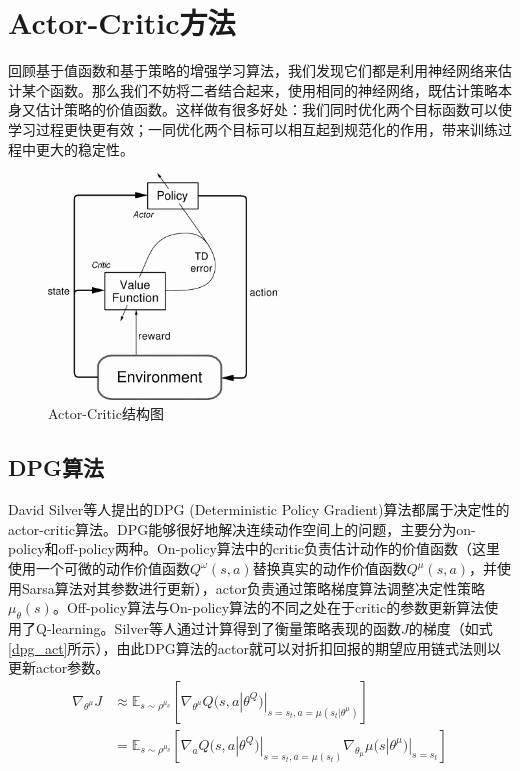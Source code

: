\section{Actor-Critic方法}
回顾基于值函数和基于策略的增强学习算法，我们发现它们都是利用神经网络来估计某个函数。那么我们不妨将二者结合起来，使用相同的神经网络，既估计策略本身又估计策略的价值函数。这样做有很多好处：我们同时优化两个目标函数可以使学习过程更快更有效；一同优化两个目标可以相互起到规范化的作用，带来训练过程中更大的稳定性。
\begin{figure}
    \centering
    \includegraphics[height=6cm]{figure/actor-critic.png}
    \caption{Actor-Critic结构图}
    \label{fig:actor-critic}
\end{figure}
\subsection{DPG算法}
\label{sec:DPG}
David Silver等人提出的DPG (Deterministic Policy Gradient)\cite{silver2014deter}算法都属于决定性的actor-critic算法。DPG能够很好地解决连续动作空间上的问题，主要分为on-policy和off-policy两种。On-policy算法中的critic负责估计动作的价值函数（这里使用一个可微的动作价值函数$Q^\omega(s,a)$替换真实的动作价值函数$Q^\mu(s,a)$，并使用Sarsa算法对其参数进行更新），actor负责通过策略梯度算法调整决定性策略$\mu_\theta(s)$。Off-policy算法与On-policy算法的不同之处在于critic的参数更新算法使用了Q-learning。Silver等人通过计算得到了衡量策略表现的函数$J$的梯度\cite{silver2014deter}（如式\ref{dpg_act}所示），由此DPG算法的actor就可以对折扣回报的期望应用链式法则以更新actor参数。
\begin{equation}
\begin{split}
  \nabla_{\theta^\mu} J &\approx
  \mathbb{E}_{s \sim \rho^{\mu_\theta}}\left[\nabla_{\theta^{\mu}}
    Q(s, a | \theta^Q)|_{s = s_t, a = \mu(s_t | \theta^{\mu})}
                   \right] \\
                 & =
    \mathbb{E}_{s \sim \rho^{\mu_\theta}}\left[\nabla_{a} Q(s, a | \theta^{Q})|_{s = s_t, a = \mu(s_t)}
    \nabla_{\theta_\mu} \mu(s | \theta^{\mu})|_{s = s_t} \right]
\end{split}
\label{dpg_act}
\end{equation}

